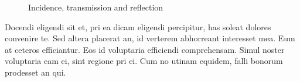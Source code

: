 \begin{figure}[htb]
\begin{center}
  \end{center}
  \caption{Incidence, transmission and reflection}
  \label{CHAPTER2_FIG03}
\end{figure}

Docendi eligendi sit et, pri ea dicam eligendi percipitur, has soleat 
dolores convenire te. Sed altera placerat an, id verterem abhorreant 
interesset mea. Eum at ceteros efficiantur. Eos id voluptaria efficiendi 
comprehensam. Simul noster voluptaria eam ei, sint regione pri ei. Cum no 
utinam equidem, falli bonorum prodesset an qui. 
